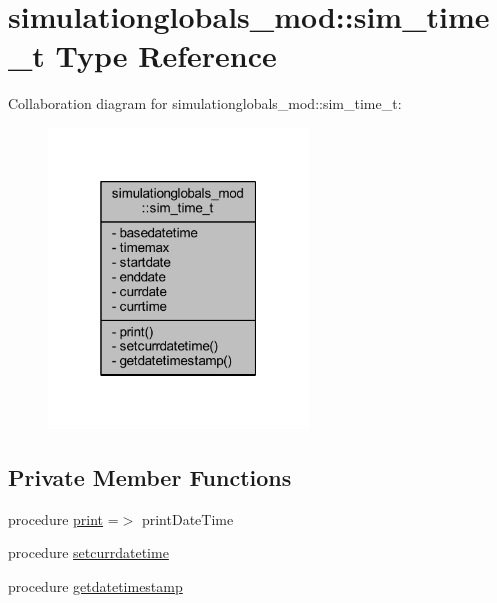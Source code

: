\hypertarget{structsimulationglobals__mod_1_1sim__time__t}{}\section{simulationglobals\+\_\+mod\+:\+:sim\+\_\+time\+\_\+t Type Reference}
\label{structsimulationglobals__mod_1_1sim__time__t}


Collaboration diagram for simulationglobals\+\_\+mod\+:\+:sim\+\_\+time\+\_\+t\+:
\nopagebreak
\begin{figure}[H]
\begin{center}
\leavevmode
\includegraphics[width=196pt]{structsimulationglobals__mod_1_1sim__time__t__coll__graph}
\end{center}
\end{figure}
\subsection*{Private Member Functions}
\begin{DoxyCompactItemize}
\item 
procedure \mbox{\hyperlink{structsimulationglobals__mod_1_1sim__time__t_a24aa321faaaf3f94343ae2161cf873cd}{print}} =$>$ print\+Date\+Time
\item 
procedure \mbox{\hyperlink{structsimulationglobals__mod_1_1sim__time__t_adb083c01d6e79f6bdc715a4cd85a155d}{setcurrdatetime}}
\item 
procedure \mbox{\hyperlink{structsimulationglobals__mod_1_1sim__time__t_ada67e9a9bc56121febffba51622be61e}{getdatetimestamp}}
\end{DoxyCompactItemize}
